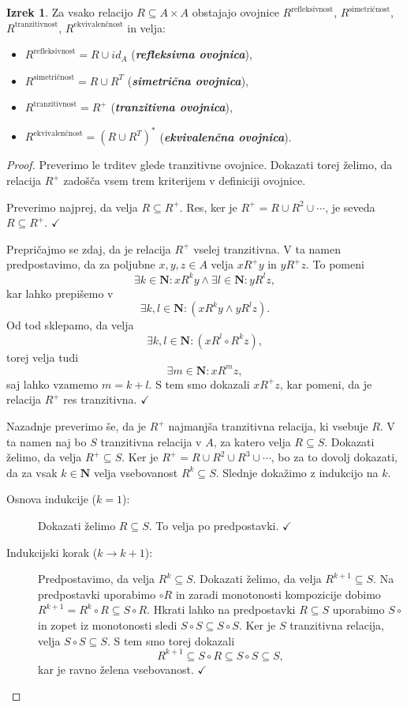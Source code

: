 \documentclass[11pt]{book}
\def\NN{\mathbf{N}}
\def\definicija{\color{rdeca}\bf\em}
\def\kljuka{$\checkmark$}
\theoremstyle{definition}
\theoremstyle{zgled}
\theoremstyle{odprtproblem}
\theoremstyle{domacanaloga}
\newenvironment{dokaz}
    {\color{siva}\begin{proof}}
    {\end{proof}}
\theoremstyle{izrek}
\newtheorem*{izrek}{Izrek}
\begin{document}
\begin{izrek}
Za vsako relacijo $R \subseteq A \times A$ obstajajo ovojnice $R^\text{refleksivnost}$, $R^\text{simetričnost}$, $R^\text{tranzitivnost}$, $R^\text{ekvivalenčnost}$ in velja:
\begin{itemize}
    \item $R^\text{refleksivnost} = R \cup id_A$ ({\definicija refleksivna ovojnica}), 
    \item $R^\text{simetričnost} = R \cup R^T$ ({\definicija simetrična ovojnica}), 
    \item $R^\text{tranzitivnost} = R^+$ ({\definicija tranzitivna ovojnica}), 
    \item $R^\text{ekvivalenčnost} = (R \cup R^T)^*$ ({\definicija ekvivalenčna ovojnica}).
\end{itemize}
\end{izrek}
\begin{dokaz}
Preverimo le trditev glede tranzitivne ovojnice. Dokazati torej želimo, da relacija $R^+$ zadošča vsem trem kriterijem v definiciji ovojnice.

Preverimo najprej, da velja $R \subseteq R^+$. Res, ker je $R^+ = R \cup R^2 \cup \cdots$, je seveda $R \subseteq R^+$. \kljuka

Prepričajmo se zdaj, da je relacija $R^+$ vselej tranzitivna. V ta namen predpostavimo, da za poljubne $x,y,z \in A$ velja $xR^+y$ in $yR^+z$. To pomeni
\[
    \exists k \in \NN \colon x R^k y \land \exists l \in \NN \colon y R^l z,
\]
kar lahko prepišemo v
\[
    \exists k, l \in \NN \colon (x R^k y \land y R^l z).
\]
Od tod sklepamo, da velja
\[
    \exists k, l \in \NN \colon (x R^l \circ R^k z),
\]
torej velja tudi
\[
    \exists m \in \NN \colon x R^m z,
\]
saj lahko vzamemo $m = k + l$. S tem smo dokazali $x R^+ z$, kar pomeni, da je relacija $R^+$ res tranzitivna. \kljuka

Nazadnje preverimo še, da je $R^+$ najmanjša tranzitivna relacija, ki vsebuje $R$. V ta namen naj bo $S$ tranzitivna relacija v $A$, za katero velja $R \subseteq S$. Dokazati želimo, da velja $R^+ \subseteq S$. Ker je $R^+ = R \cup R^2 \cup R^3 \cup \cdots$, bo za to dovolj dokazati, da za vsak $k \in \NN$ velja vsebovanost $R^k \subseteq S$. Slednje dokažimo z indukcijo na $k$.
\begin{description}
    \item[Osnova indukcije ($k = 1$):] Dokazati želimo $R \subseteq S$. To velja po predpostavki. \kljuka
    \item[Indukcijski korak ($k \to k+1$):] Predpostavimo, da velja $R^k \subseteq S$. Dokazati želimo, da velja $R^{k+1} \subseteq S$. Na predpostavki uporabimo $\circ R$ in zaradi monotonosti kompozicije dobimo $R^{k+1} = R^k \circ R \subseteq S \circ R$. Hkrati lahko na predpostavki $R \subseteq S$ uporabimo $S \circ$ in zopet iz monotonosti sledi $S \circ S \subseteq S \circ S$. Ker je $S$ tranzitivna relacija, velja $S \circ S \subseteq S$. S tem smo torej dokazali
    \[
        R^{k+1} \subseteq S \circ R \subseteq S \circ S \subseteq S,
    \]
    kar je ravno želena vsebovanost. \kljuka
\end{description}
\end{dokaz}
\end{document}
